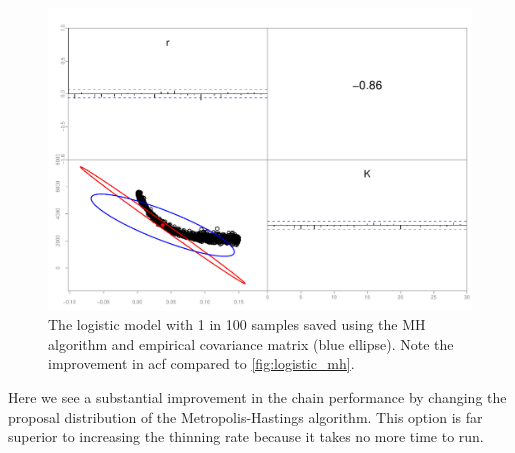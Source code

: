 \documentclass{article}\usepackage[]{graphicx}\usepackage[]{color}
\begin{document}
\begin{figure}[h]
  \centering
  \includegraphics[width=5in]{../plots/logistic_mh2.pdf}
  \caption{The logistic model with 1 in 100 samples saved
    using the MH algorithm and empirical covariance matrix
    (blue ellipse). Note the improvement in acf compared to
    \ref{fig:logistic_mh}.}
  \label{fig:logistic_mh2}
\end{figure}
Here we see a substantial improvement in the chain
performance by changing the proposal distribution of the
Metropolis-Hastings algorithm. This option is far superior
to increasing the thinning rate because it takes no more
time to run.
\end{document}
